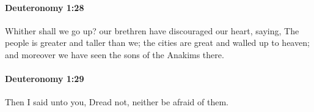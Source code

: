 		\paragraph{Deuteronomy 1:28} %
			\label{DEUTERONOMY-1-28}

			Whither shall we go up? our brethren have discouraged our heart, saying, The people is greater and taller than we; the cities are great and walled up to heaven; and moreover we have seen the sons of the Anakims there.


		\paragraph{Deuteronomy 1:29} %
			\label{DEUTERONOMY-1-29}

			Then I said unto you, Dread not, neither be afraid of them.


